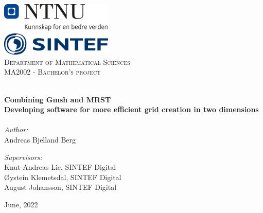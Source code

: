 
\begin{titlepage}
\vbox{ }
\vbox{ }
\begin{center}
\includegraphics[width=0.40\textwidth]{report/Images/NTNU_logo.png}\\[1cm]
\includegraphics[width=0.40\textwidth]{report/Images/SINTEF_logo.png}\\[1cm]
\textsc{\LARGE Department of Mathematical Sciences}\\[1.5cm]
\textsc{\Large MA2002 - Bachelor's project}\\[0.5cm]
\vbox{ }

\HRule \\[0.4cm]
{ \huge \bfseries Combining Gmsh and MRST}\\[0.4cm]
{ \Large \bfseries Developing software for more efficient grid creation in two dimensions}\\[0.4cm]
\HRule \\[1.5cm]

\large
\emph{Author:}\\
Andreas Bjelland Berg


\emph{Supervisors:}\\
Knut-Andreas Lie, SINTEF Digital \\
Øystein Klemetsdal, SINTEF Digital \\
August Johansson, SINTEF Digital \\
\vfill

{\large June, 2022}
\end{center}
\end{titlepage}